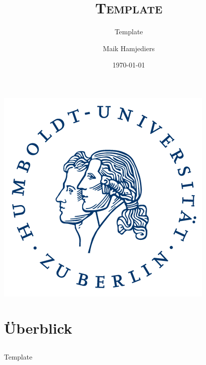 \documentclass[hyperref={pdfpagelabels=false}]{beamer}
\author{Maik Hamjediers}
\institute{\normalsize Institut für Sozialwissenschaften}
\title[Template]{\Large \textsc{Template}}
\subtitle{\large Template}
\date{\scriptsize \today}
\begin{document}
\makeatletter
\let\old@beamer@writeslidentry\beamer@writeslidentry
\def\beamer@writeslidentry{%
	\expandafter\beamer@ifempty\expandafter{\beamer@framestartpage}{}%
	{%
		\clearpage\beamer@notesactions%
	}
}
\makeatother
\begin{frame}[plain, t]
	\hfill \includegraphics[scale=.1]{husiegel.png}
	\vspace{-15pt} 
	\titlepage
\end{frame}

\makeatletter
\let\beamer@writeslidentry\old@beamer@writeslidentry
\makeatother

\section{Überblick}
\subsection*{}
\begin{frame}{Template}

\end{frame}
\end{document}
